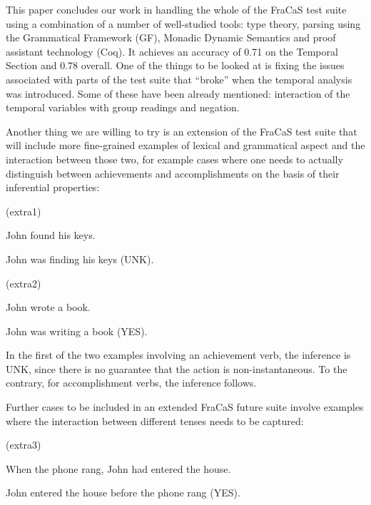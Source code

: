 \documentclass[a4paper,11pt]{article}
\newcommand\hyp{\item[H]}
\newcommand\fracasex[2]{\begin{lingex}\item[(#1)] \begin{subex} #2 \end{subex} \end{lingex} }
\begin{document}
This paper concludes our work in handling the whole of the FraCaS test
suite using a combination of a number of well-studied tools: type
theory, parsing using the Grammatical Framework (GF), Monadic Dynamic
Semantics and proof assistant technology (Coq). It achieves an
accuracy of 0.71 on the Temporal Section and 0.78 overall.  One of the
things to be looked at is fixing the issues associated with parts of
the test suite that ``broke'' when the temporal analysis was
introduced. Some of these have been already mentioned: interaction of
the temporal variables with group readings and negation.

Another thing we are willing to try is an extension of the FraCaS
test suite that will include more fine-grained examples of lexical and
grammatical aspect and the interaction between those two, for example
cases where one needs to actually distinguish between achievements and
accomplishments on the basis of their inferential properties:

\fracasex{extra1}{
	\item	John found his keys.  
	\hyp 	John was finding his keys  (UNK).
}

\fracasex{extra2}{
	\item	John wrote a book.  
	\hyp 	John was writing a book  (YES).
}

In the first of the two examples involving an achievement verb, the
inference is UNK, since there is no guarantee that the action is
non-instantaneous. To the contrary, for accomplishment verbs, the
inference follows.


Further cases to be included in an extended FraCaS future suite
involve examples where the interaction between different tenses needs
to be captured:

\fracasex{extra3}{
	\item	When the phone rang, John had entered the house.  
	\hyp 	John entered the house before the phone rang (YES).
}
\end{document}
